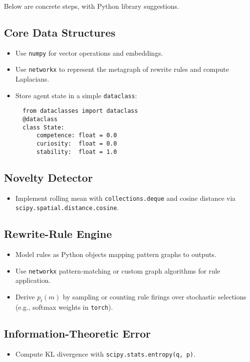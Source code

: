 \documentclass[11pt]{article}
\begin{document}
Below are concrete steps, with Python library suggestions.

\subsection{Core Data Structures}
\begin{itemize}
  \item Use \texttt{numpy} for vector operations and embeddings.
  \item Use \texttt{networkx} to represent the metagraph of rewrite rules and compute Laplacians.
  \item Store agent state in a simple \texttt{dataclass}:
  \begin{verbatim}
  from dataclasses import dataclass
  @dataclass
  class State:
      competence: float = 0.0
      curiosity:  float = 0.0
      stability:  float = 1.0
  \end{verbatim}
\end{itemize}

\subsection{Novelty Detector}
\begin{itemize}
  \item Implement rolling mean with \texttt{collections.deque} and cosine distance via \texttt{scipy.spatial.distance.cosine}.
\end{itemize}

\subsection{Rewrite-Rule Engine}
\begin{itemize}
  \item Model rules as Python objects mapping pattern graphs to outputs.
  \item Use \texttt{networkx} pattern-matching or custom graph algorithms for rule application.
  \item Derive $p_t(m)$ by sampling or counting rule firings over stochastic selections (e.g., softmax weights in \texttt{torch}).
\end{itemize}

\subsection{Information-Theoretic Error}
\begin{itemize}
  \item Compute KL divergence with \texttt{scipy.stats.entropy(q, p)}.
\end{itemize}
\end{document}

